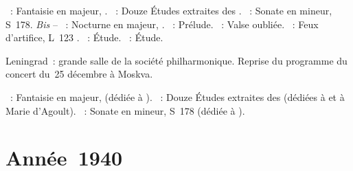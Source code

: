 \begin{description}
 \textsc{\Schumann{}}~: Fantaisie en \kC majeur, .
 \textsc{\Chopin{}}~: Douze Études extraites des .
 \textsc{\Liszt{}}~: Sonate en \kB mineur, S~178.
 \emph{Bis} -- \textsc{\Chopin{}}~: Nocturne en \kF \Sharp majeur, 
 .
 \textsc{\JBach{}}~: Prélude.
 \textsc{\Liszt{}}~: Valse oubliée.
 \textsc{\Debussy{}}~: Feux d'artifice, L~123 .
 \textsc{\Scriabine{}}~: Étude.
 \textsc{\Chopin{}}~: Étude.
 \item[\DateWithWeekDay{1939-12-29}]
 Leningrad~: grande salle de la société philharmonique.
 Reprise du programme du concert du~25 décembre à Moskva.

 \textsc{\Schumann{}}~: Fantaisie en \kC majeur,  (dédiée à
 \FLiszt{}).
 \textsc{\Chopin{}}~: Douze Études extraites des  (dédiées à
 \FLiszt{} et à Marie d'Agoult).
 \textsc{\Liszt{}}~: Sonate en \kB mineur, S~178 (dédiée à \RSchumann{}).
\end{description}

\section{Année~1940}


